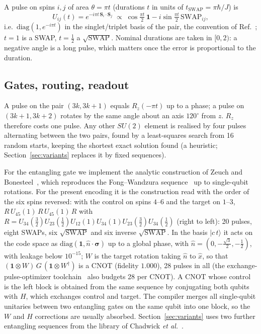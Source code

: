 \documentclass[reprint,aps,pra,amsmath,amssymb,superscriptaddress,letterpaper]{revtex4-2}
\newcommand{\ket}[1]{\lvert #1\rangle}
\newcommand{\tsw}{t_{\mathrm{SWAP}}}
\newcommand{\Sv}{\mathbf{S}}
\begin{document}
A pulse on spins $i,j$ of area $\theta=\pi t$ (durations $t$ in units of
$\tsw=\pi\hbar/J$) is
\begin{equation}
 U_{ij}(t)=e^{-i\pi t\,\Sv_i\cdot\Sv_j}
 \;\propto\;\cos\tfrac{\pi t}{2}\,\mathbf 1-i\sin\tfrac{\pi t}{2}\,\mathrm{SWAP}_{ij},
 \label{eq:pulse}
\end{equation}
i.e.\ $\mathrm{diag}(1,e^{-i\pi t})$ in the singlet/triplet basis of the pair,
the convention of Ref.~\cite{zeuch2016}; $t=1$ is a SWAP, $t=\tfrac12$ a
$\sqrt{\mathrm{SWAP}}$. Nominal durations are taken in $[0,2)$: a negative angle
is a long pulse, which matters once the error is proportional to the duration.

\subsection{Gates, routing, readout}

A pulse on the pair $(3k,3k{+}1)$ equals $R_z(-\pi t)$ up to a phase; a
pulse on $(3k{+}1,3k{+}2)$ rotates by the same angle about an axis $120^\circ$ from
$z$. $R_z$ therefore costs one pulse. Any other $SU(2)$ element is realised by
four pulses alternating between the two pairs, found by a least-squares search
from 16 random starts, keeping the shortest exact solution found (a heuristic;
Section~\ref{sec:variants} replaces it by fixed sequences).

For the entangling gate we implement the analytic construction of Zeuch and
Bonesteel~\cite{zeuch2016}, which reproduces the Fong--Wandzura
sequence~\cite{fong2011} up to single-qubit rotations. For the present
encoding it is the construction read with the order of the six spins reversed:
with the control on spins $4$--$6$ and the target on $1$--$3$, $R\,U_{45}(1)\,R\,U_{45}(1)\,R$ with
$R=U_{34}(\tfrac32)U_{23}(\tfrac12)U_{12}(1)U_{34}(1)U_{23}(\tfrac32)U_{34}(\tfrac12)$
(right to left): 20 pulses, eight SWAPs, six $\sqrt{\mathrm{SWAP}}$ and six
inverse $\sqrt{\mathrm{SWAP}}$. In the basis $\ket{c\,t}$ it acts on the code
space as $\mathrm{diag}(\mathbf 1,\hat n\cdot\boldsymbol\sigma)$ up to a global phase, with
$\hat n=(0,-\tfrac{\sqrt3}{2},-\tfrac12)$, with leakage below $10^{-15}$; $W$ is
the target rotation taking $\hat n$ to $\hat x$, so that
$(\mathbf 1\otimes W)\,G\,(\mathbf 1\otimes W^\dagger)$ is a CNOT (fidelity
$1.000$), 28 pulses in all (the exchange-pulse-optimizer toolchain~\cite{epo} also budgets 28 per CNOT). A CNOT whose control is
the left block is obtained from the same sequence by conjugating both qubits
with $H$, which exchanges control and target. The compiler merges all
single-qubit unitaries between two entangling gates on the same qubit into one
block, so the $W$ and $H$ corrections are usually absorbed. Section~\ref{sec:variants}
uses two further entangling sequences from the library of Chadwick \emph{et
al.}~\cite{chadwick2024,chadwickdata}.
\end{document}
